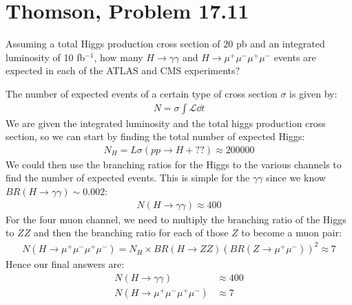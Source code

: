 \documentclass[12pt]{article}
\renewcommand{\L}{\mathcal{L}}
\begin{document}
\section{Thomson, Problem 17.11}
\begin{problem}
  Assuming a total Higgs production cross section of 20 pb and an integrated luminosity of 10 fb$^{-1}$, how many $H\to\gamma\gamma$ and $H\to\mu^+\mu^-\mu^+\mu^-$ events are expected in each of the ATLAS and CMS experiments?
\end{problem}
The number of expected events of a certain type of cross section $\sigma$ is given by:
\begin{align*}
  N=\sigma\int\L\dd{t}
\end{align*}
We are given the integrated luminosity and the total higgs production cross section, so we can start by finding the total number of expected Higgs:
\begin{align*}
  N_H=L\sigma(pp\to H+??)\approx200000
\end{align*}
We could then use the branching ratios for the Higgs to the various channels to find the number of expected events. This is simple for the $\gamma\gamma$ since we know $BR(H\to\gamma\gamma)\sim0.002$:
\begin{align*}
  N(H\to\gamma\gamma)\approx400
\end{align*}
For the four muon channel, we need to multiply the branching ratio of the Higgs to $ZZ$ and then the branching ratio for each of those $Z$ to become a muon pair:
\begin{align*}
  N(H\to\mu^+\mu^-\mu^+\mu^-)=N_H\times BR(H\to ZZ)(BR(Z\to\mu^+\mu^-))^2
  \approx7
\end{align*}
Hence our final answers are:
\begin{equation}
  \label{eq:p4}
  \boxed{
    \begin{aligned}
      N(H\to\gamma\gamma)&\approx400\\
      N(H\to\mu^+\mu^-\mu^+\mu^-)&\approx7
    \end{aligned}
  }
\end{equation}
\newpage
\end{document}
